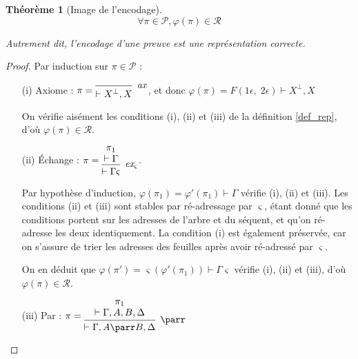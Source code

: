 \documentclass[11pt,a4paper]{article}
\theoremstyle{plain}
\newtheorem{theorem}{Théorème}
\theoremstyle{definition}
\theoremstyle{remark}
\newcommand*{\orth}{^\perp}
\newcommand*{\namedproofv}[2]{\hypo{#1}\infer[no rule]{1}{\vdash #2}}
\newcommand*{\axv}[1]{\infer{0}[\ensuremath{\mathit{ax}}]{\vdash #1}}
\newcommand*{\parrv}[1]{\infer{1}[\ensuremath{\parr}]{\vdash #1}}
\newcommand*{\permv}[2]{\infer{1}[\ensuremath{\textit{ex}_{#1}}]{\vdash #2}}
\newcommand*{\permapp}[2]{#2 #1}
\newcommand*{\someperm}{\varsigma}
\newcommand*{\someproof}{\pi}
\newcommand*{\proofs}{\ensuremath{\mathcal{P}}}
\newcommand*{\representations}{\ensuremath{\mathcal{R}}}
\newcommand*{\encode}{\ensuremath{\varphi}}
\begin{document}
\begin{theorem}[Image de l'encodage]
    \begin{equation*}
    \forall \someproof \in \proofs, \encode \left( \someproof \right) \in \representations
    \end{equation*}

    Autrement dit, l'encodage d'une preuve est une représentation correcte.
\end{theorem}

\begin{proof}
    Par induction sur $\someproof \in \proofs$ :

    \begin{itemize}
    \item[(i) Axiome :]$\someproof =
    \begin{prooftree}
        \axv{X\orth, X}
    \end{prooftree}$,
    et donc $\encode \left( \someproof \right) = F(1 \epsilon, \; 2 \epsilon) \vdash X\orth, X$

    On vérifie aisément les conditions (i), (ii) et (iii) de la définition \ref{def_rep}, d'où $\encode \left( \someproof \right) \in \representations$.

    \item[(ii) Échange :]$\someproof =
    \begin{prooftree}
        \namedproofv{\pi_1}{\Gamma}
        \permv{\someperm}{\permapp{\someperm}{\Gamma}}
    \end{prooftree}$.
    
    Par hypothèse d'induction, $\encode \left( \pi_1 \right) = \encode ' \left( \pi_1 \right) \vdash \Gamma$ vérifie (i), (ii) et (iii). Les conditions (ii) et (iii) sont stables par ré-adressage par $\someperm$, étant donné que les conditions portent sur les adresses de l'arbre et du séquent, et qu'on ré-adresse les deux identiquement. La condition (i) est également préservée, car on s'assure de trier les adresses des feuilles après avoir ré-adressé par $\someperm$.

    On en déduit que $\encode \left( \someproof' \right) = \someperm \left( \encode ' \left( \pi_1 \right) \right) \vdash \permapp{\someperm}{\Gamma}$ vérifie (i), (ii) et (iii), d'où $\encode \left( \someproof \right) \in \representations$.

    \item[(iii) Par :]$\someproof =
    \begin{prooftree}
      \namedproofv{\pi_1}{\Gamma, A, B, \Delta}
      \parrv{\Gamma, A \parr B, \Delta}
    \end{prooftree}$


\end{itemize}
\end{proof}
\end{document}
